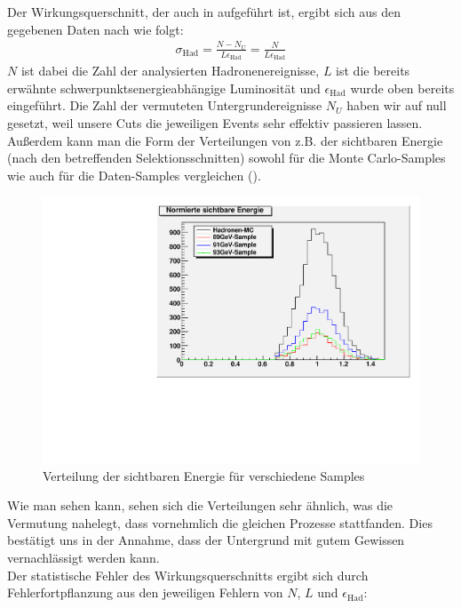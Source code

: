 Der Wirkungsquerschnitt, der auch in  aufgeführt ist, ergibt sich aus den gegebenen Daten nach \cite[Gl.13]{script} wie folgt:
\begin{eqnarray}
\sigma_\mathrm{Had} = \frac{N - N_U}{L\epsilon_\mathrm{Had}} = \frac{N}{L\epsilon_\mathrm{Had}}
\end{eqnarray}
$N$ ist dabei die Zahl der analysierten Hadronenereignisse, $L$ ist die bereits erwähnte schwerpunktsenergieabhängige Luminosität und $\epsilon_\mathrm{Had}$ wurde oben bereits eingeführt. Die Zahl der vermuteten Untergrundereignisse $N_U$ haben wir auf null gesetzt, weil unsere Cuts die jeweiligen Events sehr effektiv passieren lassen. Außerdem kann man die Form der Verteilungen von z.B. der sichtbaren Energie (nach den betreffenden Selektionsschnitten) sowohl für die Monte Carlo-Samples wie auch für die Daten-Samples vergleichen ().
\begin{figure}[htb]
	\centering
	\includegraphics[width=1\columnwidth,keepaspectratio]{Evis_vgl.pdf}
	\caption{Verteilung der sichtbaren Energie für verschiedene Samples}
	\label{fig:Evis_vgl}
\end{figure}
Wie man sehen kann, sehen sich die Verteilungen sehr ähnlich, was die Vermutung nahelegt, dass vornehmlich die gleichen Prozesse stattfanden. Dies bestätigt uns in der Annahme, dass der Untergrund mit gutem Gewissen vernachlässigt werden kann.\\
Der statistische Fehler des Wirkungsquerschnitts ergibt sich durch Fehlerfortpflanzung aus den jeweiligen Fehlern von $N$, $L$ und $\epsilon_\mathrm{Had}$:
